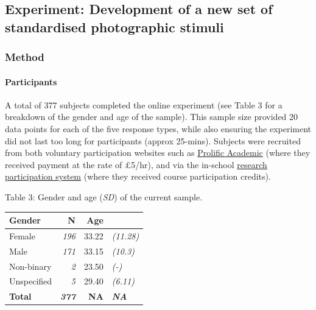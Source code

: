 \documentclass[
  11pt,
]{article}
\begin{document}
\hypertarget{experiment-development-of-a-new-set-of-standardised-photographic-stimuli}{%
\subsection{Experiment: Development of a new set of standardised
photographic
stimuli}\label{experiment-development-of-a-new-set-of-standardised-photographic-stimuli}}

\newpage

\hypertarget{method-1}{%
\subsubsection{Method}\label{method-1}}

\hypertarget{participants-1}{%
\paragraph{Participants}\label{participants-1}}

A total of 377 subjects completed the online experiment (see Table 3 for
a breakdown of the gender and age of the sample). This sample size
provided 20 data points for each of the five response types, while also
ensuring the experiment did not last too long for participants (approx
25-mins). Subjects were recruited from both voluntary participation
websites such as \href{https://www.prolific.co/}{Prolific Academic}
(where they received payment at the rate of £5/hr), and via the
in-school
\href{https://keelepsychology.sona-systems.com/}{research participation system}
(where they received course participation credits).

Table 3: Gender and age (\emph{SD}) of the current sample.

\begin{table}[!h]
\centering
\begin{tabular}{l>{}rr>{}l}
\toprule
Gender & N & Age & \\
\midrule
Female & \em{196} & 33.22 & \em{(11.28)}\\
Male & \em{171} & 33.15 & \em{(10.3)}\\
Non-binary & \em{2} & 23.50 & \em{(-)}\\
Unspecified & \em{5} & 29.40 & \em{(6.11)}\\
\textbf{Total} & \textbf{\em{377}} & \textbf{NA} & \textbf{\em{NA}}\\
\bottomrule
\end{tabular}
\end{table}
\end{document}
